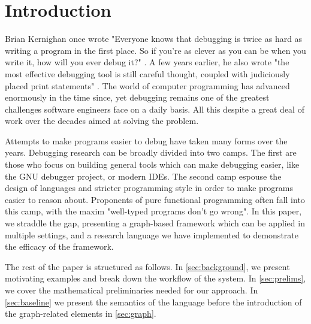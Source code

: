 \section{Introduction}
Brian Kernighan once wrote "Everyone knows that debugging is twice as hard as
writing a program in the first place. So if you're as clever as you can be when
you write it, how will you ever debug it?" \cite{Kernighan82}. A few years
earlier, he also wrote "the most effective debugging tool is still careful
thought, coupled with judiciously placed print statements" \cite{Kernighan78}.
The world of computer programming has advanced enormously in the time since,
yet debugging remains one of the greatest challenges software engineers face
on a daily basis. All this despite a great deal of work over the decades
aimed at solving the problem.

Attempts to make programs easier to debug have taken many forms over the years.
Debugging research can be broadly divided into two camps. The first are those
who focus on building general tools which can make debugging easier, like the
GNU debugger project, or modern IDEs. The second camp espouse the design of
languages and stricter programming style in order to make programs easier to
reason about. Proponents of pure functional programming often fall into this camp,
with the maxim "well-typed programs don't go wrong". In this paper, we straddle the
gap, presenting a graph-based framework which can be applied in multiple settings, and a
research language we have implemented to demonstrate the efficacy of the framework.

The rest of the paper is structured as follows. In \ref{sec:background}, we present
motivating examples and break down the workflow of the system. In \ref{sec:prelims},
we cover the mathematical preliminaries needed for our approach. In \ref{sec:baseline}
we present the semantics of the language before the introduction of the graph-related
elements in \ref{sec:graph}.
